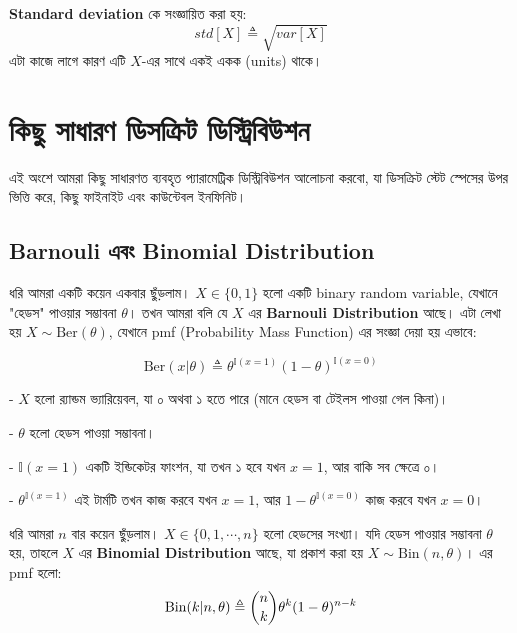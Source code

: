 \documentclass[graybox, envcountchap, twocolumn]{styles/svmult}
\begin{document}
\bengalifont 
\textbf{Standard deviation} কে সংজ্ঞায়িত করা হয়:
\begin{equation}
std[X] \triangleq \sqrt{var[X]}
\end{equation}
\bengalifont 
এটা কাজে লাগে কারণ এটি \(X\)-এর সাথে একই একক (units) থাকে।

\section{{\bengalifont কিছু সাধারণ ডিসক্রিট ডিস্ট্রিবিউশন}}

{\bengalifont
এই অংশে আমরা কিছু সাধারণত ব্যবহৃত প্যারামেট্রিক ডিস্ট্রিবিউশন আলোচনা করবো, যা ডিসক্রিট স্টেট স্পেসের উপর ভিত্তি করে, কিছু ফাইনাইট এবং কাউন্টেবল ইনফিনিট।}

\subsection{{\bengalifont Barnouli  এবং Binomial Distribution}}

\begin{definition}
\bengalifont
ধরি  আমরা একটি কয়েন একবার ছুঁড়লাম। $X \in \{0,1\}$ হলো একটি binary random variable, যেখানে "হেডস" পাওয়ার সম্ভাবনা $\theta$। তখন আমরা বলি যে $X$ এর \textbf{Barnouli Distribution} আছে। এটা লেখা হয় $X \sim \text{Ber}(\theta)$, যেখানে pmf (Probability Mass Function) এর সংজ্ঞা দেয়া হয় এভাবে:

\begin{equation}
\text{Ber}(x|\theta) \triangleq \theta^{\mathbb{I}(x=1)}(1-\theta)^{\mathbb{I}(x=0)}
\end{equation}
\end{definition}

\bengalifont
- $X$ হলো র‍্যান্ডম ভ্যারিয়েবল, যা ০ অথবা ১ হতে পারে (মানে হেডস বা টেইলস পাওয়া গেল কিনা)।

- $\theta$ হলো হেডস পাওয়া সম্ভাবনা।

- $\mathbb{I}(x=1)$ একটি ইন্ডিকেটর ফাংশন, যা তখন ১ হবে যখন $x=1$, আর বাকি সব ক্ষেত্রে ০।

- $\theta^{\mathbb{I}(x=1)}$ এই টার্মটি তখন কাজ করবে যখন $x = 1$, আর $1 - \theta^{\mathbb{I}(x=0)}$ কাজ করবে যখন $x = 0$।

\begin{definition}
ধরি আমরা $n$ বার কয়েন ছুঁড়লাম। $X \in \{0,1,\cdots,n\}$ হলো হেডসের সংখ্যা। যদি হেডস পাওয়ার সম্ভাবনা $\theta$ হয়, তাহলে $X$ এর \textbf{Binomial Distribution} আছে, যা প্রকাশ করা হয় $X \sim \text{Bin}(n, \theta)$। এর pmf হলো:
\begin{equation}\label{eqn:binomial-pmf}
\text{Bin}(k|n,\theta) \triangleq \dbinom{n}{k}\theta^k(1-\theta)^{n-k}
\end{equation}
\end{definition}
\end{document}
